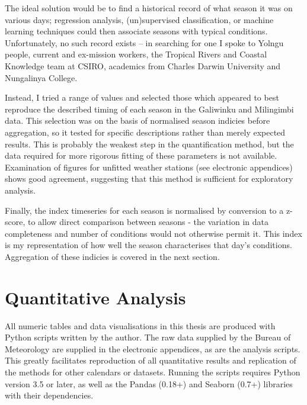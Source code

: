 The ideal solution would be to find a historical record of what season
it was on various days; regression analysis, (un)supervised classification,
or machine learning techniques could then associate seasons with typical
conditions.  Unfortunately, no such record exists -- in searching for one
I spoke to Yolngu people, current and ex-mission workers, the Tropical
Rivers and Coastal Knowledge team at CSIRO, academics from Charles Darwin
University and Nungalinya College.

Instead, I tried a range of values and selected those which appeared to
best reproduce the described timing of each season in the Galiwinku and
Milingimbi data.  This selection was on the basis of normalised season
indicies before aggregation, so it tested for specific descriptions
rather than merely expected results.
%
This is probably the weakest step in the quantification method, but the data
required for more rigorous fitting of these parameters is not available.
Examination of figures for unfitted weather stations (see electronic appendices)
shows good agreement, suggesting that this method is sufficient for exploratory
analysis.

Finally, the index timeseries for each season is normalised by conversion to
a z-score, to allow direct comparison between seasons - the variation in data
completeness and number of conditions would not otherwise permit it.
This index is my representation of how well the season characterises that day's
conditions.  Aggregation of these indicies is covered in the next section.



\section{Quantitative Analysis}

All numeric tables and data visualisations in this thesis are produced
with Python scripts written by the author.  The raw data supplied by the
Bureau of Meteorology are supplied in the electronic appendices, as
are the analysis scripts.  This greatly facilitates reproduction of all
quantitative results and replication of the methods for other calendars
or datasets.  Running the scripts requires Python version 3.5 or later,
as well as the Pandas (0.18+) and Seaborn (0.7+) libraries with their
dependencies.

